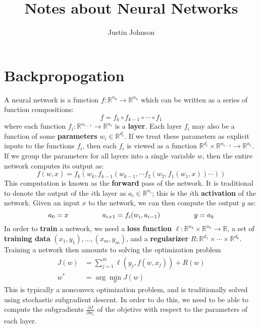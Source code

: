 \documentclass{article}
\title{Notes about Neural Networks}
\author{Justin Johnson}
\newcommand{\RR}{\mathbb{R}}
\newcommand{\pd}[2]{\frac{\partial#1}{\partial#2}}
\begin{document}
\maketitle

\section{Backpropogation}
A neural network is a function $f:\RR^{n_0}\to\RR^{n_k}$ which can be written as a series of function
compositions:
\[f = f_k \circ f_{k-1} \circ \cdots \circ f_1\]
where each function $f_i:\RR^{n_{i-1}}\to\RR^{n_i}$ is a \textbf{layer}.
Each layer $f_i$ may also be a function of some \textbf{parameters} $w_i\in\RR^{d_i}$. If we treat these
parameters as explicit inputs to the functions $f_i$, then each $f_i$ is viewed as a function
$\RR^{d_i}\times\RR^{n_{i-1}}\to\RR^{n_i}$. If we group the parameters for all layers into a single variable
$w$, then the entire network computes its output as:
\[f(w, x) = f_k(w_k, f_{k-1}(w_{k-1}, \cdots f_2(w_2, f_1(w_1, x)) \cdots ))\]
This computation is known as the \textbf{forward} pass of the network. It is traditional to denote the output
of the $i$th layer as $a_i\in\RR^{n_i}$; this is the $i$th \textbf{activation} of the network.
Given an input $x$ to the network, we can then compute the output $y$ as:
\[a_0 = x \hspace{4pc} a_{i+1} = f_i(w_i, a_{i-1}) \hspace{4pc} y = a_k\]
In order to \textbf{train} a network, we need a \textbf{loss function} $\ell:\RR^{n_k}\times\RR^{n_k}\to\RR$,
a set of \textbf{training data} $(x_1, y_1),\ldots,(x_m,y_m)$, and a \textbf{regularizer}
$R:\RR^{d_1}\times\cdots\times\RR^{d_k}$. Training a network then amounts to
solving the optimization problem
\begin{align*}
  J(w) &= \sum_{j=1}^m\ell(y_j, f(w, x_j)) + R(w) \\
  w^* &= \arg\min_w J(w)
\end{align*}
This is typically a nonconvex optimization problem, and is traditionally solved using stochastic subgradient
descent. In order to do this, we need to be able to compute the subgradients $\pd{J}{w_i}$ of the objetive
with respect to the parameters of each layer.
\end{document}
